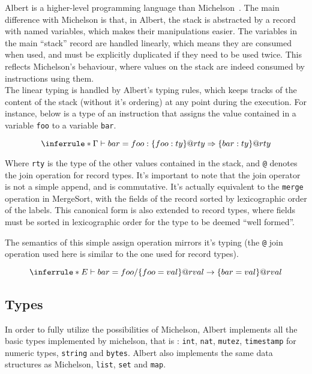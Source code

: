 \documentclass{report}
\begin{document}
Albert is a higher-level programming language than Michelson~\cite{albertProposal}. The main difference with Michelson is that, in Albert, the stack is abstracted by a record with named variables, which makes their manipulations easier. The variables in the main ``stack'' record are handled linearly, which means they are consumed when used, and must be explicitly duplicated if they need to be used twice. This reflects Michelson's behaviour, where values on the stack are indeed consumed by instructions using them.\\

The linear typing is handled by Albert's typing rules, which keeps tracks of the content of the stack (without it's ordering) at any point during the execution. For instance, below is a type of an instruction that assigns the value contained in a variable \texttt{foo} to a variable \texttt{bar}.

$$
\inferrule*
    { }
    { \Gamma \vdash bar = foo : \{ foo : ty \} @ rty \Rightarrow \{ bar : ty \} @ rty }
$$

    Where \texttt{rty} is the type of the other values contained in the stack, and \texttt{@} denotes the join operation for record types. It's important to note that the join operator is not a simple append, and is commutative. It's actually equivalent to the \texttt{merge} operation in MergeSort, with the fields of the record sorted by lexicographic order of the labels. This canonical form is also extended to record types, where fields must be sorted in lexicographic order for the type to be deemed ``well formed''.

The semantics of this simple assign operation mirrors it's typing (the \texttt{@} join operation used here is similar to the one used for record types).

$$
\inferrule*
    { }
    { E \vdash bar = foo / \{ foo = val \} @ rval \rightarrow \{ bar = val \} @ rval }
    $$

\subsection{Types}

In order to fully utilize the possibilities of Michelson, Albert implements all the basic types implemented by michelson, that is : \texttt{int}, \texttt{nat}, \texttt{mutez}, \texttt{timestamp} for numeric types, \texttt{string} and \texttt{bytes}. Albert also implements the same data structures as Michelson, \texttt{list}, \texttt{set} and \texttt{map}.
    
\end{document}
